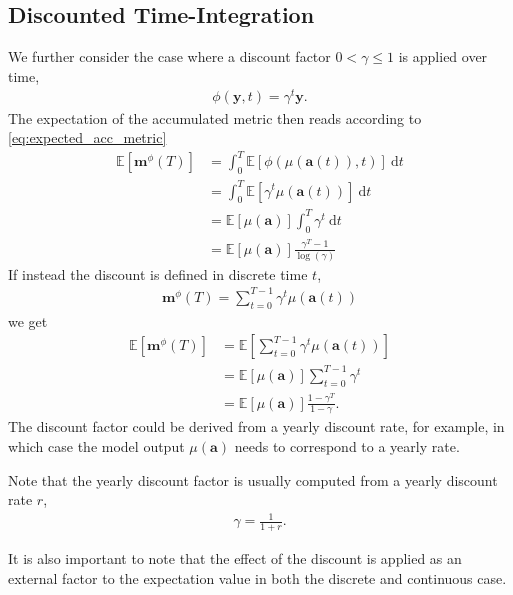 \documentclass{article}
\begin{document}
    \subsection{Discounted Time-Integration}
    We further consider the case where a discount factor $0<\gamma \le 1$ is applied over time,
    \begin{align}
        \phi(\boldsymbol{y}, t) = \gamma^t \boldsymbol{y}.
    \end{align}
    The expectation of the accumulated metric then reads according to \eqref{eq:expected_acc_metric}
    \begin{align}
        \mathbb{E}\left[{\boldsymbol{m}^\phi}(T)\right] &= \int_0^T \mathbb{E}\left[\phi\left(\mu(\boldsymbol{a}(t)), t\right)\right]\ \text{d}t\\
        &= \int_0^T \mathbb{E}\left[\gamma^t\mu(\boldsymbol{a}(t))\right]\ \text{d}t\\
        &= \mathbb{E}\left[\mu(\boldsymbol{a})\right]\int_0^T \gamma^t\ \text{d}t\\
        &= \mathbb{E}\left[\mu(\boldsymbol{a})\right] \frac{\gamma^T - 1}{\log(\gamma)}
    \end{align}
    If instead the discount is defined in discrete time $t$,
    \begin{align}
        {\boldsymbol{m}}^\phi(T)= \sum_{t = 0}^{T - 1}\gamma^t \mu(\boldsymbol{a}(t))
    \end{align}
    we get
    \begin{align}
        \mathbb{E}\left[{\boldsymbol{m}^\phi}(T)\right] &= \mathbb{E}\left[\sum_{t = 0}^{T - 1}\gamma^t \mu(\boldsymbol{a}(t))\right]\\
        &= \mathbb{E}\left[\mu(\boldsymbol{a})\right]\sum_{t = 0}^{T - 1}\gamma^t\\
        &= \mathbb{E}\left[\mu(\boldsymbol{a})\right]\frac{1 - \gamma^T}{1 - \gamma}.
    \end{align}
    The discount factor could be derived from a yearly discount rate, for example, in which case the model output $\mu(\boldsymbol{a})$ needs to correspond to a yearly rate.

    Note that the yearly discount factor is usually computed from a yearly discount rate $r$,
    \begin{align}
        \gamma = \frac{1}{1 + r}.
    \end{align}

    It is also important to note that the effect of the discount is applied as an external factor to the expectation value in both the discrete and continuous case. 
    
\end{document}
